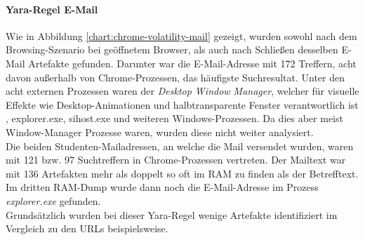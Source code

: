\paragraph*{Yara-Regel \glqq{}E-Mail\grqq{}}\label{chap:ergebnisse-chrome-uncommon-volatility-email}
Wie in Abbildung \ref{chart:chrome-volatility-mail} gezeigt, wurden sowohl nach dem Browsing-Szenario bei geöffnetem Browser, als auch nach Schließen desselben E-Mail Artefakte gefunden. Darunter war die E-Mail-Adresse mit 172 Treffern, acht davon außerhalb von Chrome-Prozessen, das häufigste Suchresultat. Unter den acht externen Prozessen waren der \textit{Desktop Window Manager}, welcher für visuelle Effekte wie Desktop-Animationen und halbtransparente Fenster verantwortlich ist \cite{dwmWebsite}, explorer.exe, sihost.exe und weiteren Windows-Prozessen. Da dies aber meist Window-Manager Prozesse waren, wurden diese nicht weiter analysiert. \\
Die beiden Studenten-Mailadressen, an welche die Mail versendet wurden, waren mit 121 bzw. 97 Suchtreffern in Chrome-Prozessen vertreten. Der Mailtext war mit 136 Artefakten mehr als doppelt so oft im RAM zu finden als der Betrefftext. Im dritten RAM-Dump wurde dann noch die E-Mail-Adresse im Prozess \textit{explorer.exe} gefunden.\\
Grundsätzlich wurden bei dieser Yara-Regel wenige Artefakte identifiziert im Vergleich zu den URLs beispielsweise.


